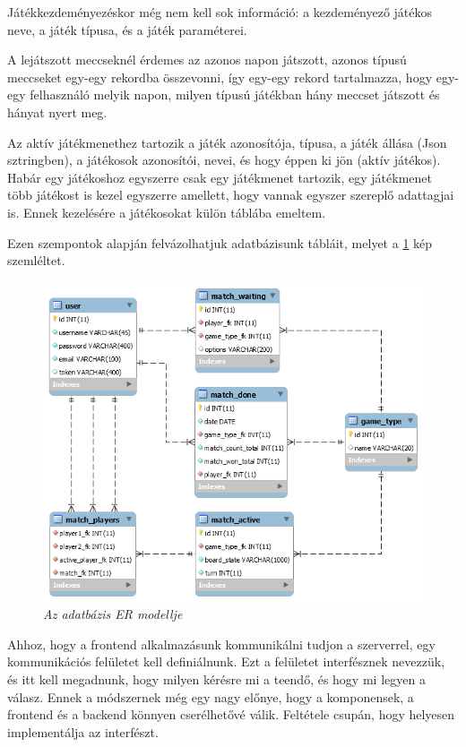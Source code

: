 Játékkezdeményezéskor még nem kell sok információ: a kezdeményező játékos neve, a játék típusa, és a játék paraméterei.

A lejátszott meccseknél érdemes az azonos napon játszott, azonos típusú meccseket egy-egy rekordba összevonni, így egy-egy rekord tartalmazza, hogy egy-egy felhasználó melyik napon, milyen típusú játékban hány meccset játszott és hányat nyert meg.

Az aktív játékmenethez tartozik a játék azonosítója, típusa, a játék állása (Json sztringben), a játékosok azonosítói, nevei, és hogy éppen ki jön (aktív játékos). Habár egy játékoshoz egyszerre csak egy játékmenet tartozik, egy játékmenet több játékost is kezel egyszerre amellett, hogy vannak egyszer szereplő adattagjai is. Ennek kezelésére a játékosokat külön táblába emeltem.

Ezen szempontok alapján felvázolhatjuk adatbázisunk tábláit, melyet a \ref{fig:er-model} kép szemléltet.

\begin{figure}[!h]
	\centering
	\includegraphics[width=0.9\linewidth]{kepek/online-games-er.png}
	\caption{\textit{Az adatbázis ER modellje}}
	\label{fig:er-model}
\end{figure}





Ahhoz, hogy a frontend alkalmazásunk kommunikálni tudjon a szerverrel, egy kommunikációs felületet kell definiálnunk. Ezt a felületet interfésznek nevezzük, és itt kell megadnunk, hogy milyen kérésre mi a teendő, és hogy mi legyen a válasz. Ennek a módszernek még egy nagy előnye, hogy a komponensek, a frontend és a backend könnyen cserélhetővé válik. Feltétele csupán, hogy helyesen implementálja az interfészt.

